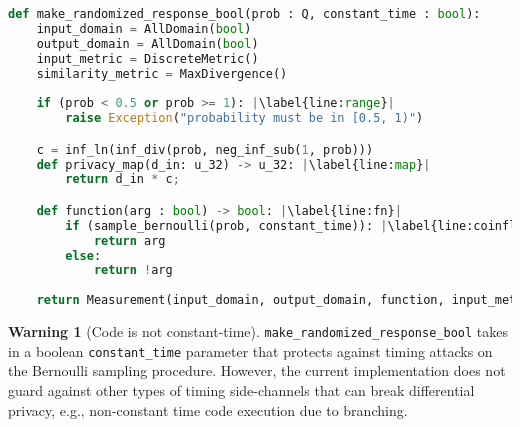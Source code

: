 \documentclass[11pt,a4paper]{article}
\newcommand{\hanwen}[1]{{ {\color{purple}{(hanwen)~#1}}}}
\theoremstyle{definition}
\newtheorem{warning}{Warning}
\begin{document}
\begin{lstlisting}[language=Python, escapechar=|]
def make_randomized_response_bool(prob : Q, constant_time : bool):
    input_domain = AllDomain(bool)
    output_domain = AllDomain(bool)
    input_metric = DiscreteMetric()
    similarity_metric = MaxDivergence()
    
    if (prob < 0.5 or prob >= 1): |\label{line:range}|
        raise Exception("probability must be in [0.5, 1)")

    c = inf_ln(inf_div(prob, neg_inf_sub(1, prob)))
    def privacy_map(d_in: u_32) -> u_32: |\label{line:map}|
        return d_in * c;

    def function(arg : bool) -> bool: |\label{line:fn}|
        if (sample_bernoulli(prob, constant_time)): |\label{line:coinflip}|
            return arg
        else:
            return !arg
    
    return Measurement(input_domain, output_domain, function, input_metric, similarity_metric, privacy_map)

\end{lstlisting}

\begin{tcolorbox}
\begin{warning}[Code is not constant-time]
 \texttt{make\_randomized\_response\_bool} takes in a boolean \texttt{constant\_time} parameter that protects against timing attacks on the Bernoulli sampling procedure. However, the current implementation does not guard against other types of timing side-channels that can break differential privacy, e.g., non-constant time code execution due to branching.
\end{warning}
\end{tcolorbox}
\end{document}
